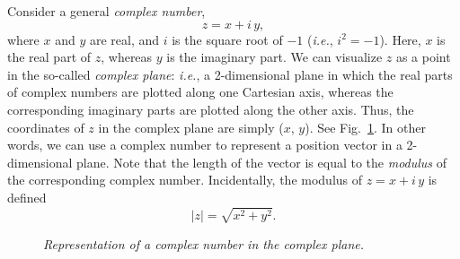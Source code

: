 Consider a general {\em complex number},
\begin{equation}
z = x +  i\,y,
\end{equation}
where $x$ and $y$ are real, and $i$ is the square root of $-1$ ({\em i.e.}, $i^2=-1$).
Here, $x$ is the real part of $z$, whereas $y$ is the imaginary part.
We can visualize $z$ as a point in the so-called {\em complex plane}: {\em i.e.}, a 2-dimensional
plane
in which the real parts of complex numbers are plotted along one Cartesian axis, whereas the
corresponding imaginary parts are plotted along the other axis.
 Thus, the coordinates
of $z$ in the complex plane are simply ($x$, $y$). See Fig.~\ref{f63}. In other words,
we can use a complex number to represent a position vector in a 2-dimensional plane.
Note that the length of the vector is equal to the {\em modulus} of the corresponding complex
number. Incidentally, the modulus of $z = x + i\,y$ is defined
\begin{equation}
|z| = \sqrt{x^2 + y^2}.
\end{equation}

\begin{figure}
\epsfysize=2.5in
\centerline{}
\caption{\em Representation of a complex number in the complex plane.}\label{f63}  
\end{figure}

